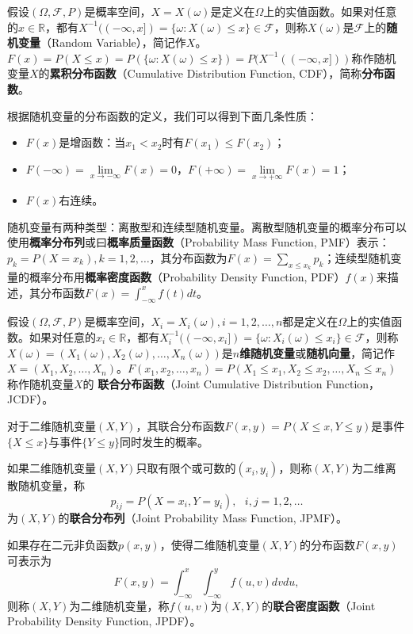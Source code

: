 \begin{definition}[随机变量及其分布函数]
假设$(\Omega,\mathscr F, P)$是概率空间，$X=X(\omega)$是定义在$\Omega$上的实值函数。如果对任意的$x\in \mathbb R$，都有$X^{-1}((-\infty,x])=\{\omega: X(\omega)\le x\}\in \mathscr F$，则称$X(\omega)$是$\mathscr F$上的\textbf{随机变量}（Random Variable），简记作$X$。$F(x) = P(X\le x)=P(\{\omega: X(\omega)\le x\})=P(X^{-1}((-\infty,x]))$称作随机变量$X$的\textbf{累积分布函数}（Cumulative Distribution Function, CDF），简称\textbf{分布函数}。
\end{definition}
根据随机变量的分布函数的定义，我们可以得到下面几条性质：
\begin{itemize}
  \item $F(x)$是增函数：当$x_1<x_2$时有$F(x_1)\le F(x_2)$；
  \item $F(-\infty) = \lim\limits_{x\rightarrow -\infty} F(x)=0$，$F(+\infty) = \lim\limits_{x\rightarrow +\infty} F(x)=1$；
  \item $F(x)$右连续。
\end{itemize}
随机变量有两种类型：离散型和连续型随机变量。离散型随机变量的概率分布可以使用\textbf{概率分布列}或曰\textbf{概率质量函数}（Probability Mass Function, PMF）表示：$p_k = P(X=x_k),k=1,2,\ldots$，其分布函数为$F(x)=\sum\limits_{x\le x_k} p_k$；连续型随机变量的概率分布用\textbf{概率密度函数}（Probability Density Function, PDF）$f(x)$来描述，其分布函数$F(x)=\int_{-\infty}^x f(t)dt$。

\begin{definition}[多维随机变量及其分布函数]
假设$(\Omega,\mathscr F, P)$是概率空间，$X_i=X_i(\omega), i=1,2,\ldots,n$都是定义在$\Omega$上的实值函数。如果对任意的$x_i\in \mathbb R$，都有$X_i^{-1}((-\infty,x_i])=\{\omega: X_i(\omega)\le x_i\}\in \mathscr F$，则称$X(\omega)=(X_1(\omega),X_2(\omega),\ldots,X_n(\omega))$是\textbf{$n$维随机变量}或\textbf{随机向量}，简记作$X=(X_1,X_2,\ldots,X_n)$。$F(x_1,x_2,\ldots,x_n) = P(X_1\le x_1,X_2\le x_2,\ldots, X_n\le x_n)$称作随机变量$X$的
\textbf{联合分布函数}（Joint Cumulative Distribution Function，JCDF）。
\end{definition}

对于二维随机变量$(X,Y)$，其联合分布函数$F(x,y)=P(X\le x, Y\le y)$是事件$\{X\le x\}$与事件$\{Y\le y\}$同时发生的概率。
\begin{definition}[二维离散随机变量与联合分布列]
如果二维随机变量$(X,Y)$只取有限个或可数的$(x_i,y_i)$，则称$(X,Y)$为二维离散随机变量，称
\[
    p_{ij} = P(X=x_i, Y=y_i),~~~i,j=1,2,\ldots
\]
为$(X,Y)$的\textbf{联合分布列}（Joint Probability Mass Function, JPMF）。
\end{definition}
\begin{definition}[二维连续随机变量与联合密度函数]
如果存在二元非负函数$p(x,y)$，使得二维随机变量$(X,Y)$的分布函数$F(x,y)$可表示为
\[
    F(x,y)=\int_{-\infty}^x \int_{-\infty}^y f(u,v) dv du,
\]
则称$(X,Y)$为二维随机变量，称$f(u,v)$为$(X,Y)$的\textbf{联合密度函数}（Joint Probability Density Function, JPDF）。
\end{definition}

